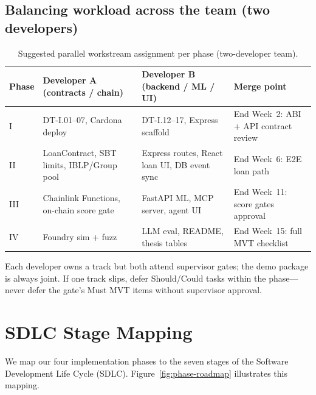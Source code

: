 \documentclass[12pt,a4paper]{report}
\newcommand{\tableheadcolor}{\rowcolor{TableHeadBg}}
\begin{document}
\subsection{Balancing workload across the team (two developers)}

\begin{table}[H]
\centering
\caption[Parallel workstream assignment]{Suggested parallel workstream assignment per phase (two-developer team).}
\label{tab:team-workstreams}
\small
\begin{tabular}{p{1.2cm}p{4.5cm}p{4.5cm}p{3.8cm}}
\toprule
\tableheadcolor
\textbf{Phase} & \textbf{Developer A (contracts / chain)} & \textbf{Developer B (backend / ML / UI)} & \textbf{Merge point} \\
\midrule
I & DT-I.01--07, Cardona deploy & DT-I.12--17, Express scaffold & End Week~2: ABI + API contract review \\
II & LoanContract, SBT limits, IBLP/Group pool & Express routes, React loan UI, DB event sync & End Week~6: E2E loan path \\
III & Chainlink Functions, on-chain score gate & FastAPI ML, MCP server, agent UI & End Week~11: score gates approval \\
IV & Foundry sim + fuzz & LLM eval, README, thesis tables & End Week~15: full MVT checklist \\
\bottomrule
\end{tabular}
\end{table}

\noindent Each developer owns a track but both attend supervisor gates; the demo package is always joint. If one track slips, defer Should/Could tasks within the phase---never defer the gate's Must MVT items without supervisor approval.


\section{SDLC Stage Mapping}

We map our four implementation phases to the seven stages of the Software Development Life Cycle (SDLC). Figure~\ref{fig:phase-roadmap} illustrates this mapping.
\end{document}
